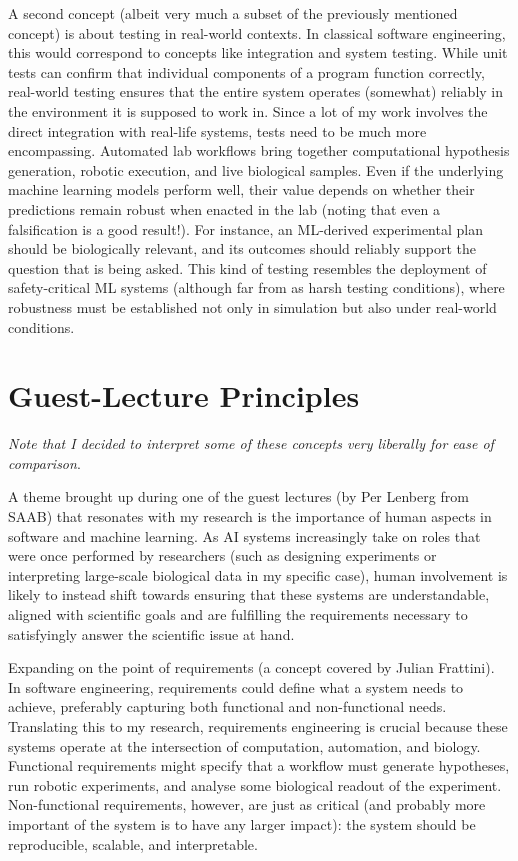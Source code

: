 \documentclass[11pt,compsoc,a4paper]{IEEEtran}
\begin{document}
    A second concept (albeit very much a subset of the previously mentioned concept) is about testing in real-world contexts. In classical software engineering, this would correspond to concepts like integration and system testing. While unit tests can confirm that individual components of a program function correctly, real-world testing ensures that the entire system operates (somewhat) reliably in the environment it is supposed to work in. Since a lot of my work involves the direct integration with real-life systems, tests need to be much more encompassing. Automated lab workflows bring together computational hypothesis generation, robotic execution, and live biological samples. Even if the underlying machine learning models perform well, their value depends on whether their predictions remain robust when enacted in the lab (noting that even a falsification is a good result!). For instance, an ML-derived experimental plan should be biologically relevant, and its outcomes should reliably support the question that is being asked. This kind of testing resembles the deployment of safety-critical ML systems (although far from as harsh testing conditions), where robustness must be established not only in simulation but also under real-world conditions. 

\section{Guest-Lecture Principles}

    \textit{Note that I decided to interpret some of these concepts very liberally for ease of comparison}.
    \newline

    \noindent A theme brought up during one of the guest lectures (by Per Lenberg from SAAB) that resonates with my research is the importance of human aspects in software and machine learning. As AI systems increasingly take on roles that were once performed by researchers (such as designing experiments or interpreting large-scale biological data in my specific case), human involvement is likely to instead shift towards ensuring that these systems are understandable, aligned with scientific goals and are fulfilling the requirements necessary to satisfyingly answer the scientific issue at hand. 

    Expanding on the point of requirements (a concept covered by Julian Frattini). In software engineering, requirements could define what a system needs to achieve, preferably capturing both functional and non-functional needs. Translating this to my research, requirements engineering is crucial because these systems operate at the intersection of computation, automation, and biology. Functional requirements might specify that a workflow must generate hypotheses, run robotic experiments, and analyse some biological readout of the experiment. Non-functional requirements, however, are just as critical (and probably more important of the system is to have any larger impact): the system should be reproducible, scalable, and interpretable. 
\end{document}
